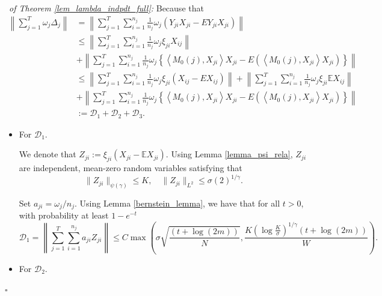 \documentclass[12pt]{article}
\newenvironment{pf}{{\noindent\it Proof}\ }{\hfill $\square$\par}
\begin{document}
\begin{pf}{\it of Theorem \ref{lem_lambda_indpdt_full}:}
  Because that 
  \begin{equation}
  \begin{aligned}
  \left\|\sum_{j=1}^T \omega_j \Delta_j\right\|
  &=\left\|\sum_{j=1}^{T} \sum_{i=1}^{n_{j}} \frac{1}{n_{j}} \omega_j\left(Y_{j i} X_{j i}-E Y_{j i} X_{j i}\right)\right\| \\ 
  & \le\left\|\sum_{j=1}^{T} \sum_{i=1}^{n_{j}} \frac{1}{n_{j}} \omega_j\xi_{ji}X_{ij}\right\|\\
  &+\left\|\sum_{j=1}^{T} \sum_{i=1}^{n_{j}} \frac{1}{n_{j}} \omega_j\left\{\left\langle M_0(j),X_{ji}\right\rangle X_{ji}-E\left(\left\langle M_0(j),X_{ji}\right\rangle X_{ji}\right)\right\}\right\|\\
  &\le\left\|\sum_{j=1}^{T} \sum_{i=1}^{n_{j}} \frac{1}{n_{j}} \omega_j\xi_{ji}(X_{ij}-EX_{ij})\right\|+\left\|\sum_{j=1}^{T} \sum_{i=1}^{n_{j}} \frac{1}{n_{j}} \omega_j\xi_{ji}\mathbb{E}X_{ij}\right\|\\
  &+\left\|\sum_{j=1}^{T} \sum_{i=1}^{n_{j}} \frac{1}{n_{j}} \omega_j\left\{\left\langle M_0(j),X_{ji}\right\rangle X_{ji}-E\left(\left\langle M_0(j),X_{ji}\right\rangle X_{ji}\right)\right\}\right\|\\&
  \label{eq:variance}
  :=
  \mathcal{D}_1 +\mathcal{D}_2 +\mathcal{D}_3. 
  \end{aligned}
  \end{equation}
  \begin{itemize}
  \item[a.] For $\mathcal{D}_1$.

  We denote that $Z_{ji} := \xi_{ji} (X_{ji} - \mathbb{E}X_{ji})$. Using Lemma \ref{lemma_psi_rela}, $Z_{ji}$ are independent, mean-zero random variables satisfying that 
  \begin{equation*}
   \|Z_{ji}\|_{\psi(\gamma)} \le K,\quad \|Z_{ji}\|_{L^{2}}\le\sigma (2)^{1/\gamma}.
  \end{equation*}

  Set $a_{ji} = {\omega_j}/{n_j}$. Using Lemma \ref{bernstein_lemma}, we have that for all $t>0$, with probability at least $1-e^{-t}$
  \begin{equation}
  \label{d1_bound}
  \mathcal{D}_1 = \left\|\sum_{j=1}^{T}\sum_{i=1}^{n_j}a_{ji}Z_{ji}\right\| \le  C\max \left(\sigma \sqrt{\frac{(t+\log(2m))}{N}},\frac{K\left(\log \frac{K}{\sigma}\right)^{1/\gamma}(t + \log(2m))}{W}\right).
  \end{equation}
  \item[b.] For $\mathcal{D}_2$.


\end{itemize}
\end{pf}
\end{document}
